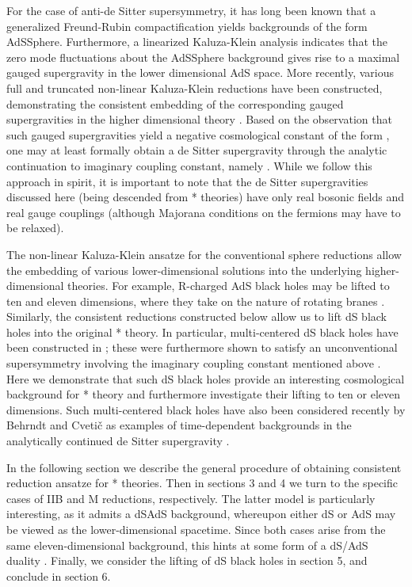 \documentclass[a4paper,12pt]{article}
\begin{document}
For the case of anti-de Sitter supersymmetry, it has long been known
that a generalized Freund-Rubin compactification yields backgrounds of
the form AdS\myHighlight{$\times$}\coordHE{}Sphere.  Furthermore, a linearized Kaluza-Klein
analysis indicates that the zero mode fluctuations about the
AdS\myHighlight{$\times$}\coordHE{}Sphere background gives rise to a maximal gauged supergravity
in the lower dimensional AdS space.  More recently, various full and
truncated non-linear Kaluza-Klein reductions have been constructed,
demonstrating the consistent embedding of the corresponding gauged
supergravities in the higher dimensional theory
\cite{deWit,Cvetic,Nastase:1999cb,Nastase,Lu:1999bc,Lu:1999bw,Cvetic:1999au,Cvetic:1999xx,Cvetic:2000eb,Cvetic2,Cvetic:2000dm}.
Based on the observation that such gauged supergravities yield a
negative cosmological constant of the form \coordHE{}, one may at
least formally obtain a de Sitter supergravity through the analytic
continuation to imaginary coupling constant, namely \coordHE{}.
While we follow this approach in spirit, it is important to note that
the de Sitter supergravities discussed here (being descended from *
theories) have only real bosonic fields and real gauge couplings
(although Majorana conditions on the fermions may have to be relaxed).

The non-linear Kaluza-Klein ansatze for the conventional sphere reductions
allow the embedding of various lower-dimensional solutions into the
underlying higher-dimensional theories.  For example, R-charged AdS black
holes may be lifted to ten and eleven dimensions, where they take on the
nature of rotating branes \cite{Cvetic}.  Similarly, the consistent
reductions constructed below allow us to lift dS black holes into the
original * theory.  In particular, multi-centered dS black holes have been
constructed in \cite{Kastor:1992nn,London}; these were furthermore
shown to satisfy an unconventional supersymmetry involving the imaginary
coupling constant mentioned above \cite{London,Liu}.  Here we demonstrate
that such dS black holes provide an interesting cosmological background for
* theory and furthermore investigate their lifting to ten or eleven dimensions.
Such multi-centered black holes have also been considered recently by
Behrndt and Cveti\v{c} as examples of time-dependent backgrounds in the
analytically continued de Sitter supergravity \cite{Behrndt}.

In the following section we describe the general procedure of obtaining
consistent reduction ansatze for * theories.  Then in sections 3 and 4
we turn to the specific cases of IIB\myHighlight{$^*$}\coordHE{} and M\myHighlight{$^*$}\coordHE{} reductions,
respectively.  The latter model is particularly interesting, as it
admits a dS\myHighlight{$_4\times$}\coordHE{}AdS\coordHE{} background, whereupon either dS\coordHE{} or
AdS\coordHE{} may be viewed as the lower-dimensional spacetime.  Since both
cases arise from the same eleven-dimensional background, this hints at
some form of a dS\coordHE{}/AdS\coordHE{} duality \cite{Batrachenko:2002pu}.  Finally,
we consider the
lifting of dS black holes in section 5, and conclude in section 6.
\end{document}
